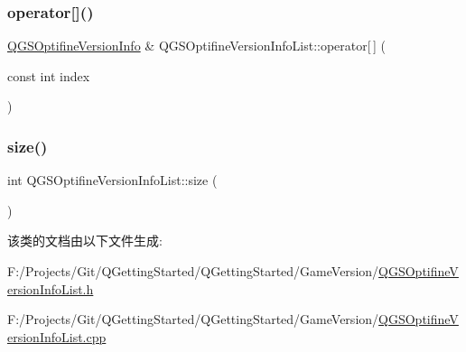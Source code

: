 \subsubsection{\texorpdfstring{operator[]()}{operator[]()}}
{\footnotesize\ttfamily \mbox{\hyperlink{class_q_g_s_optifine_version_info}{Q\+G\+S\+Optifine\+Version\+Info}} \& Q\+G\+S\+Optifine\+Version\+Info\+List\+::operator\mbox{[}$\,$\mbox{]} (\begin{DoxyParamCaption}\item[{const int}]{index }\end{DoxyParamCaption})}

\mbox{\label{class_q_g_s_optifine_version_info_list_a0ff7a163fac562dcf2b88cceb18a4ad0}} 
\subsubsection{\texorpdfstring{size()}{size()}}
{\footnotesize\ttfamily int Q\+G\+S\+Optifine\+Version\+Info\+List\+::size (\begin{DoxyParamCaption}{ }\end{DoxyParamCaption})}



该类的文档由以下文件生成\+:\begin{DoxyCompactItemize}
\item 
F\+:/\+Projects/\+Git/\+Q\+Getting\+Started/\+Q\+Getting\+Started/\+Game\+Version/\mbox{\hyperlink{_q_g_s_optifine_version_info_list_8h}{Q\+G\+S\+Optifine\+Version\+Info\+List.\+h}}\item 
F\+:/\+Projects/\+Git/\+Q\+Getting\+Started/\+Q\+Getting\+Started/\+Game\+Version/\mbox{\hyperlink{_q_g_s_optifine_version_info_list_8cpp}{Q\+G\+S\+Optifine\+Version\+Info\+List.\+cpp}}\end{DoxyCompactItemize}
